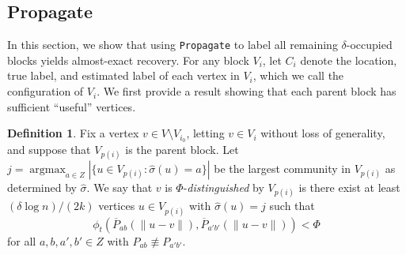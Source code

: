 \documentclass{article}
\DeclareMathOperator*{\argmax}{argmax}
\newcommand{\1}{\mathbbm{1}}
\theoremstyle{definition}
\newtheorem{definition}{Definition}
\theoremstyle{plain}
\begin{document}
\subsection{Propagate}
\label{subappx:propagate_proof}
In this section, we show that using \texttt{Propagate} to label all remaining $\delta$-occupied blocks yields almost-exact recovery. For any block $V_i$, let $C_i$ denote the location, true label, and estimated label of each vertex in $V_i$, which we call the configuration of $V_i$. We first provide a result showing that each parent block has sufficient ``useful'' vertices. 

\begin{definition}
    Fix a vertex $v \in V \setminus V_{i_0}$, letting $v \in V_i$ without loss of generality, and suppose that $V_{p(i)}$ is the parent block. Let $j = \argmax_{a \in Z} |\{ u \in V_{p(i)}: \hat{\sigma}(u) = a \}|$ be the largest community in $V_{p(i)}$ as determined by $\hat{\sigma}$. We say that $v$ is $\Phi$-\textit{distinguished} by $V_{p(i)}$ is there exist at least $(\delta \log n)/(2k)$ vertices $u \in V_{p(i)}$ with $\hat{\sigma}(u) = j$ such that
    \begin{equation*}
        \phi_t(\overline{P}_{ab}(\|u-v\|), \overline{P}_{a'b'}(\|u-v\|)) < \Phi
    \end{equation*}
    for all $a,b,a',b' \in Z$ with $P_{ab} \not \equiv P_{a'b'}$.
\end{definition}
\end{document}
